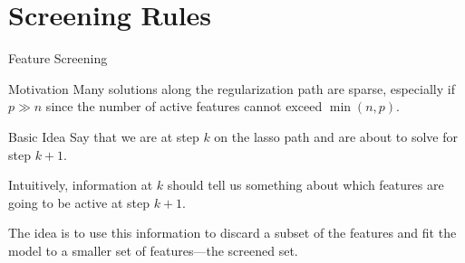 \documentclass[10pt,ignorenonframetext]{beamer}
\begin{document}
\section{Screening Rules}

\begin{frame}{Feature Screening}
  \begin{block}{Motivation}
    Many solutions along the regularization path are \alert{sparse},
    especially if \(p \gg n\) since the number of active features cannot exceed \(\min(n, p)\).
  \end{block}

  \pause

  \begin{block}{Basic Idea}
    Say that we are at step \(k\) on the lasso path and are about to solve for
    step \(k + 1\). \medskip

    Intuitively, information at \(k\) should tell us something
    about which features are going to be active at step \(k + 1\). \medskip

    The idea is to use this information to \alert{discard} a subset of the
    features and fit the model to a smaller set of features---the screened
    set.
  \end{block}
\end{frame}





\end{document}
